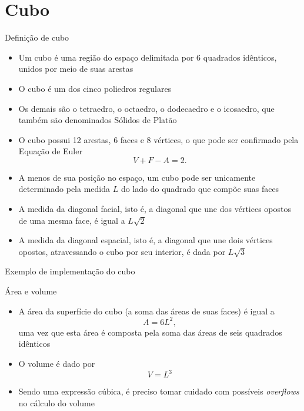 \section{Cubo}

\begin{frame}[fragile]{Definição de cubo}

    \begin{itemize}
        \item Um cubo é uma região do espaço delimitada por 6 quadrados idênticos, 
            unidos por meio de suas arestas

        \item O cubo é um dos cinco poliedros regulares

        \item Os demais são o tetraedro, o octaedro, o dodecaedro e o icosaedro, que também são
            denominados Sólidos de Platão

        \item O cubo possui 12 arestas, 6 faces e 8 vértices,
            o que pode ser confirmado pela Equação de Euler
        \[
            V + F - A = 2.
        \]

        \item A menos de sua posição no espaço, um cubo pode ser unicamente determinado pela
            medida $L$ do lado do quadrado que compõe suas faces

        \item A medida da diagonal facial, isto é, a diagonal que une dos vértices opostos de uma 
            mesma face, é igual a $L\sqrt{2}$

        \item A medida da diagonal espacial, isto é, a diagonal que une dois vértices opostos,
            atravessando o cubo por seu interior, é dada por $L\sqrt{3}$

    \end{itemize}

\end{frame}

\begin{frame}[fragile]{Exemplo de implementação do cubo}
\end{frame}

\begin{frame}[fragile]{Área e volume}

    \begin{itemize}
        \item A área da superfície do cubo (a soma das áreas de suas faces) é igual a
            \[
                A = 6L^2,
            \] uma vez que esta área é composta pela soma das áreas de seis quadrados
            idênticos

        \item O volume é dado por 
        \[
            V = L^3
        \]

        \item Sendo uma expressão cúbica, é preciso tomar cuidado com possíveis \textit{overflows} 
            no cálculo do volume
    \end{itemize}

\end{frame}

